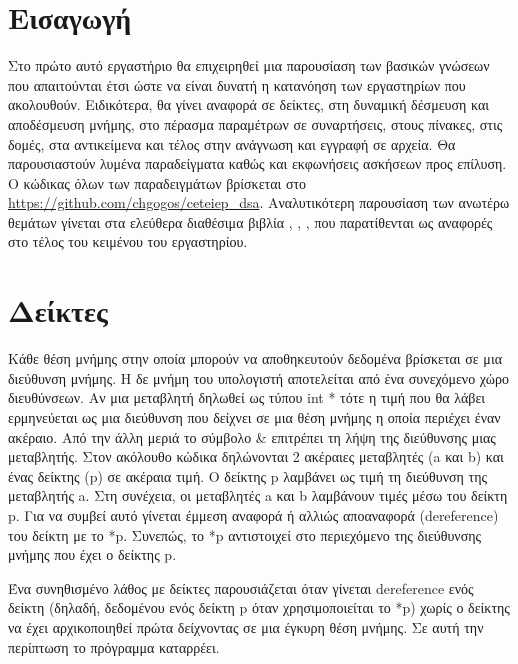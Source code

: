 \section{Εισαγωγή}
Στο πρώτο αυτό εργαστήριο θα επιχειρηθεί μια παρουσίαση των βασικών γνώσεων που απαιτούνται έτσι ώστε να είναι δυνατή η κατανόηση των εργαστηρίων που ακολουθούν. Ειδικότερα, θα γίνει αναφορά σε δείκτες, στη δυναμική δέσμευση και αποδέσμευση μνήμης, στο πέρασμα παραμέτρων σε συναρτήσεις, στους πίνακες, στις δομές, στα αντικείμενα και τέλος στην ανάγνωση και εγγραφή σε αρχεία. Θα παρουσιαστούν λυμένα παραδείγματα καθώς και εκφωνήσεις ασκήσεων προς επίλυση. Ο κώδικας όλων των παραδειγμάτων βρίσκεται στο \href{https://github.com/chgogos/ceteiep_dsa}{https://github.com/chgogos/ceteiep\_dsa}. Αναλυτικότερη παρουσίαση των ανωτέρω θεμάτων γίνεται στα ελεύθερα διαθέσιμα βιβλία \cite{stamatiadis2017}, \cite{downey2012}, \cite{soulie2007}, \cite{hall2007} που παρατίθενται ως αναφορές στο τέλος του κειμένου του εργαστηρίου. 

\section{Δείκτες}
Κάθε θέση μνήμης στην οποία μπορούν να αποθηκευτούν δεδομένα βρίσκεται σε μια διεύθυνση μνήμης. Η δε μνήμη του υπολογιστή αποτελείται από ένα συνεχόμενο χώρο διευθύνσεων. Αν μια μεταβλητή δηλωθεί ως τύπου int * τότε η τιμή που θα λάβει ερμηνεύεται ως μια διεύθυνση που δείχνει σε μια θέση μνήμης η οποία περιέχει έναν ακέραιο. Από την άλλη μεριά το σύμβολο \& επιτρέπει τη λήψη της διεύθυνσης μιας μεταβλητής. Στον ακόλουθο κώδικα δηλώνονται 2 ακέραιες μεταβλητές (a και b) και ένας δείκτης (p) σε ακέραια τιμή. Ο δείκτης p λαμβάνει ως τιμή τη διεύθυνση της μεταβλητής a. Στη συνέχεια, οι μεταβλητές a και b λαμβάνουν τιμές μέσω του δείκτη p. Για να συμβεί αυτό γίνεται έμμεση αναφορά ή αλλιώς αποαναφορά (dereference) του δείκτη με το *p. Συνεπώς, το *p αντιστοιχεί στο περιεχόμενο της διεύθυνσης μνήμης που έχει ο δείκτης p.




Ένα συνηθισμένο λάθος με δείκτες παρουσιάζεται όταν γίνεται dereference ενός δείκτη (δηλαδή, δεδομένου ενός δείκτη p όταν χρησιμοποιείται το *p) χωρίς ο δείκτης να έχει αρχικοποιηθεί πρώτα δείχνοντας σε μια έγκυρη θέση μνήμης. Σε αυτή την περίπτωση το πρόγραμμα καταρρέει. 



